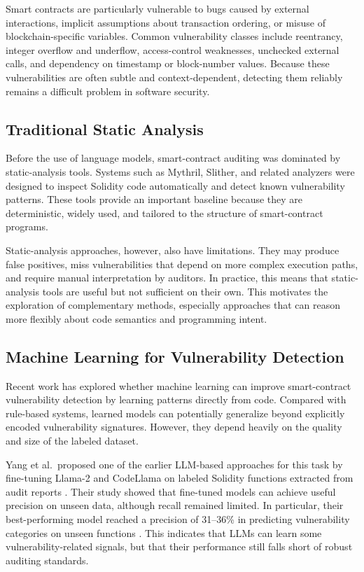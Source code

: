 \documentclass[a4paper,11pt]{article}\usepackage{graphicx} %
\begin{document}
Smart contracts are particularly vulnerable to bugs caused by external interactions, implicit assumptions about transaction ordering, or misuse of blockchain-specific variables. Common vulnerability classes include reentrancy, integer overflow and underflow, access-control weaknesses, unchecked external calls, and dependency on timestamp or block-number values. Because these vulnerabilities are often subtle and context-dependent, detecting them reliably remains a difficult problem in software security.

\subsection{Traditional Static Analysis}

Before the use of language models, smart-contract auditing was dominated by static-analysis tools. Systems such as Mythril, Slither, and related analyzers were designed to inspect Solidity code automatically and detect known vulnerability patterns. These tools provide an important baseline because they are deterministic, widely used, and tailored to the structure of smart-contract programs.

Static-analysis approaches, however, also have limitations. They may produce false positives, miss vulnerabilities that depend on more complex execution paths, and require manual interpretation by auditors. In practice, this means that static-analysis tools are useful but not sufficient on their own. This motivates the exploration of complementary methods, especially approaches that can reason more flexibly about code semantics and programming intent.

\subsection{Machine Learning for Vulnerability Detection}

Recent work has explored whether machine learning can improve smart-contract vulnerability detection by learning patterns directly from code. Compared with rule-based systems, learned models can potentially generalize beyond explicitly encoded vulnerability signatures. However, they depend heavily on the quality and size of the labeled dataset.

Yang et al.\ proposed one of the earlier LLM-based approaches for this task by fine-tuning Llama-2 and CodeLlama on labeled Solidity functions extracted from audit reports \cite{yang_automated_2023}. Their study showed that fine-tuned models can achieve useful precision on unseen data, although recall remained limited. In particular, their best-performing model reached a precision of 31--36\% in predicting vulnerability categories on unseen functions \cite{yang_automated_2023}. This indicates that LLMs can learn some vulnerability-related signals, but that their performance still falls short of robust auditing standards.
\end{document}
